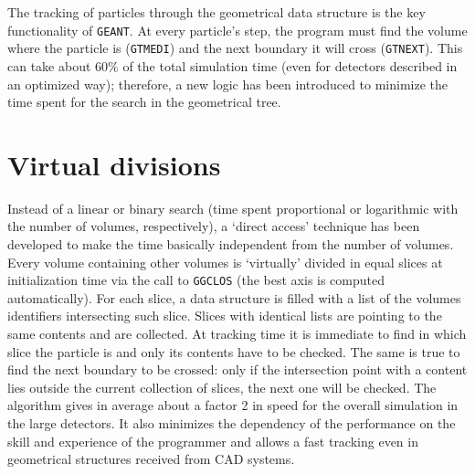       



The tracking of particles through the geometrical data structure is the key
functionality of {\tt GEANT}. 
At every particle's step, the program must find the
volume where the particle is ({\tt GTMEDI}) and the next boundary it will cross
({\tt GTNEXT}). This can take
about $60\%$ of the total simulation time (even for detectors described
in an optimized way); therefore, a new logic has been introduced to minimize
the time spent for the search in the geometrical tree. 

\section{ Virtual divisions}

Instead of a linear or
binary search (time spent proportional or logarithmic with the number of
volumes, respectively), a `direct access' technique has been developed to
make the time basically independent from the number of volumes. Every volume
containing other volumes is `virtually' divided in equal slices at 
initialization time via the call to {\tt GGCLOS}
(the best axis is computed automatically). 
For each slice,
a data structure is filled with a list of the volumes 
identifiers intersecting such
slice. 
Slices with identical lists are pointing to the same contents
and are collected. At 
tracking time it is immediate to find in which slice the particle is and only
its contents have to be checked. The same is true to find the next boundary to
be crossed: only if the intersection point with a content lies outside the 
current collection of slices, the next one will be checked. The algorithm
gives in average about a factor 2 in speed for the overall simulation in the
large detectors. It also minimizes the dependency of the performance
on the skill and experience of the programmer and allows a fast tracking even
in geometrical structures received from CAD systems.

